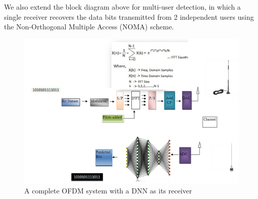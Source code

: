 We also extend the block diagram above for multi-user detection, in which a single receiver recovers the data bits transmitted from 2 independent users using the Non-Orthogonal Multiple Access (NOMA) scheme. 
\begin{figure}[htbp]
  \centering
  \includegraphics[width=\textwidth]{./Figures/comm_comparison.png}
  \caption{A complete OFDM system with a DNN as its receiver}
  \label{fig:comm_comparison}
\end{figure}
